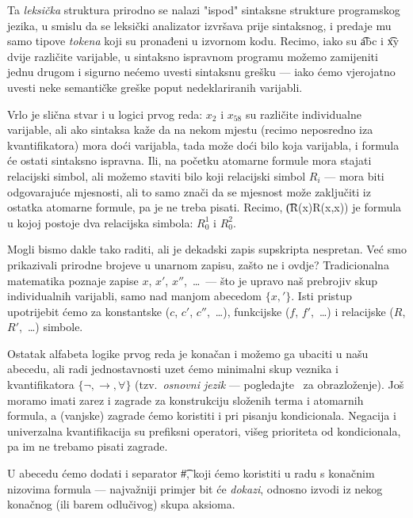 Ta \emph{leksička} struktura prirodno se nalazi "ispod" sintaksne strukture programskog jezika, u smislu da se leksički analizator izvršava prije sintaksnog, i predaje mu samo tipove \emph{tokena} koji su pronađeni u izvornom kodu. Recimo, iako su \t{abc} i \t{xy} dvije različite varijable, u sintaksno ispravnom programu možemo zamijeniti jednu drugom i sigurno nećemo uvesti sintaksnu grešku --- iako ćemo vjerojatno uvesti neke semantičke greške poput nedeklariranih varijabli.

Vrlo je slična stvar i u logici prvog reda: $x_2$ i $x_{58}$ su različite individualne varijable, ali ako sintaksa kaže da na nekom mjestu (recimo neposredno iza kvantifikatora) mora doći varijabla, tada može doći bilo koja varijabla, i formula će ostati sintaksno ispravna. Ili, na početku atomarne formule mora stajati relacijski simbol, ali možemo staviti bilo koji relacijski simbol $R_i$ --- mora biti odgovarajuće mjesnosti, ali to samo znači da se mjesnost može zaključiti iz ostatka atomarne formule, pa je ne treba pisati. Recimo, \t{(R(x)\textrightarrow R(x,x))} je formula u kojoj postoje dva relacijska simbola: $R_0^1$ i $R_0^2$.

Mogli bismo dakle tako raditi, ali je dekadski zapis supskripta nespretan. Već smo prikazivali prirodne brojeve u unarnom zapisu, zašto ne i ovdje? Tradicionalna matematika poznaje zapise $x$, $x'$, $x''$,~\ldots\ --- što je upravo naš prebrojiv skup individualnih varijabli, samo nad manjom abecedom $\{x,'\!\}$. Isti pristup upotrijebit ćemo za konstantske ($c$, $c'$, $c''$,~\ldots), funkcijske ($f$, $f'$,~\ldots) i relacijske ($R$, $R'$,~\ldots) simbole.

Ostatak alfabeta logike prvog reda je konačan i možemo ga ubaciti u našu abecedu, ali radi jednostavnosti uzet ćemo minimalni skup veznika i kvantifikatora $\{\lnot,\to,\forall\}$ (tzv\!.\ \emph{osnovni jezik} --- pogledajte~\cite[str.\ 124]{skr:VukML} za obrazloženje). Još moramo imati zarez i zagrade za konstrukciju složenih terma i atomarnih formula, a (vanjske) zagrade ćemo koristiti i pri pisanju kondicionala. Negacija i univerzalna kvantifikacija su prefiksni operatori, višeg prioriteta od kondicionala, pa im ne trebamo pisati zagrade.

U abecedu ćemo dodati i separator \t\#, koji ćemo koristiti u radu s konačnim nizovima formula --- najvažniji primjer bit će \emph{dokazi}, odnosno izvodi iz nekog konačnog (ili barem odlučivog) skupa aksioma.


